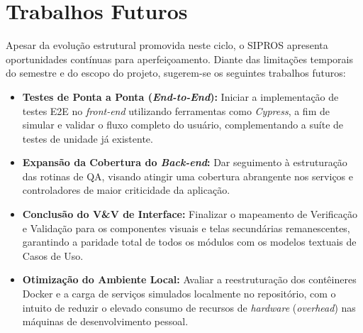 \section{Trabalhos Futuros}

Apesar da evolução estrutural promovida neste ciclo, o SIPROS apresenta oportunidades contínuas para aperfeiçoamento. Diante das limitações temporais do semestre e do escopo do projeto, sugerem-se os seguintes trabalhos futuros:

\begin{itemize}
    \item \textbf{Testes de Ponta a Ponta (\textit{End-to-End}):} Iniciar a implementação de testes E2E no \textit{front-end} utilizando ferramentas como \textit{Cypress}, a fim de simular e validar o fluxo completo do usuário, complementando a suíte de testes de unidade já existente.
    \item \textbf{Expansão da Cobertura do \textit{Back-end}:} Dar seguimento à estruturação das rotinas de QA, visando atingir uma cobertura abrangente nos serviços e controladores de maior criticidade da aplicação.
    \item \textbf{Conclusão do V\&V de Interface:} Finalizar o mapeamento de Verificação e Validação para os componentes visuais e telas secundárias remanescentes, garantindo a paridade total de todos os módulos com os modelos textuais de Casos de Uso.
    \item \textbf{Otimização do Ambiente Local:} Avaliar a reestruturação dos contêineres Docker e a carga de serviços simulados localmente no repositório, com o intuito de reduzir o elevado consumo de recursos de \textit{hardware} (\textit{overhead}) nas máquinas de desenvolvimento pessoal.
\end{itemize}
